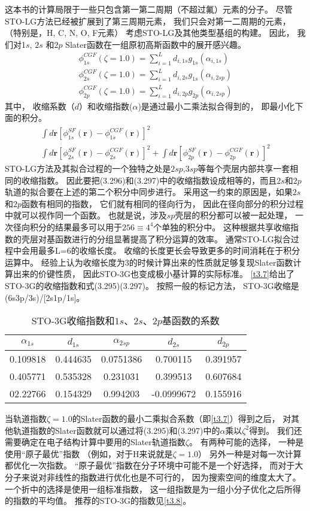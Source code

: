 这本书的计算局限于一些只包含第一第二周期（不超过氟）元素的分子。
尽管STO-LG方法已经被扩展到了第三周期元素，
我们只会对第一二周期的元素，
（特别是，H, C, N, O, F元素）
考虑STO-LG及其他类型基组的构建。
因此，
我们对1$s$,
$2s$ 和$2p$ Slater函数在一组原初高斯函数中的展开感兴趣。
\begin{align}
	\phi_{1s}^{CGF}(\zeta=1.0)=\sum_{i=1}^{L}d_{i,1s}g_{1s}(\alpha_{i,1s})\\
	\phi_{2s}^{CGF}(\zeta=1.0)=\sum_{i=1}^{L}d_{i,2s}g_{1s}(\alpha_{i,2sp})\\
	\phi_{2p}^{CGF}(\zeta=1.0)=\sum_{i=1}^{L}d_{i,2p}g_{2p}(\alpha_{i,2sp})
\end{align}
其中，
收缩系数（$d$）和收缩指数($\alpha$)是通过最小二乘法拟合得到的，
即最小化下面的积分。
\begin{align*}
	\int d\mathbf{r}[\phi_{1s}^{SF}(\mathbf{r})-\phi_{1s}^{CGF}(\mathbf{r})]^2\\
	\int d\mathbf{r}[\phi_{2s}^{SF}(\mathbf{r})-\phi_{2s}^{CGF}(\mathbf{r})]^2+	\int d\mathbf{r}[\phi_{2p}^{SF}(\mathbf{r})-\phi_{2p}^{CGF}(\mathbf{r})]^2
\end{align*}
STO-LG方法及其拟合过程的一个独特之处是$2sp$,$3sp$等每个壳层内部共享一套相同的收缩指数。
因此要把(3.296)和(3.297)中的收缩指数设成相等的，而且$2s$和$2p$轨道的拟合要在上述的第二个积分中同步进行。
采用这一约束的原因是，如果$2s$和$2p$函数有相同的指数，
它们就有相同的径向行为，
因此在径向部分的积分过程中就可以视作同一个函数。
也就是说，涉及$sp$壳层的积分都可以被一起处理，
一次径向积分的结果最多可以用于$256\equiv4^4$个单独的积分中。
这种根据共享收缩指数的壳层对基函数进行的分组显著提高了积分运算的效率。
通常STO-LG拟合过程中会用最多L=6的收缩长度。
收缩的长度更长会导致更多的时间消耗在于积分运算中。
经验上认为收缩长度为3的时候计算出来的性质就足够复现Slater函数计算出来的价键性质，
因此STO-3G也变成极小基计算的实际标准。
\autoref{t3.7}给出了STO-3G的收缩指数和式(3.295)(3.297)。
按照一般的标记方法，
STO-3G收缩是(6s3p/3s)/[2s1p/1s]。
\begin{table}[h]
	\centering\caption{STO-3G收缩指数和$1s$、$2s$、$2p$基函数的系数}
	\begin{tabular}{ccccc}
		\hline
		$\alpha_{1s}$&$d_{1s}$&$\alpha_{2sp}$&$d_{2s}$&$d_{2p}$\\\hline
		0.109818	 &0.444635&0.0751386	 &0.700115&0.391957\\
		0.405771	 &0.535328&0.231031	 &0.399513&0.607684\\
		02.22766	 &0.154329&0.994203	 &-0.0999672&0.155916\\
		\hline
	\end{tabular}
	\label{t3.7}
\end{table}
当轨道指数$\zeta = 1.0$的Slater函数的最小二乘拟合系数（即\autoref{t3.7}）得到之后，
对其他轨道指数的Slater函数就可以通过将(3.295)和(3.297)中的$\alpha$乘以$\zeta^2$得到。
我们还需要确定在电子结构计算中要用的Slater轨道指数$\zeta$。
有两种可能的选择，
一种是使用“原子最优”指数
（例如，对于H来说就是$\zeta=1.0$）
另外一种是对每一次计算都优化一次指数。
“原子最优”指数在分子环境中可能不是一个好选择，
而对于大分子来说对非线性的指数进行优化也是不可行的，
因为搜索空间的维度太大了。
一个折中的选择是使用一组标准指数，
这一组指数是为一组小分子优化之后所得的指数的平均值。
推荐的STO-3G的指数见\autoref{t3.8}。

